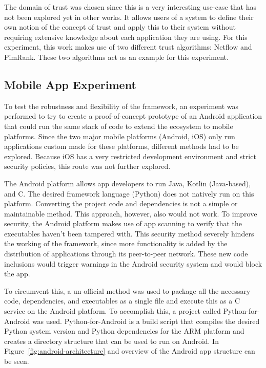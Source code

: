 The domain of trust was chosen since this is a very interesting use-case that has not been explored yet in other works. It allows users of a system to define their own notion of the concept of trust and apply this to their system without requiring extensive knowledge about each application they are using. For this experiment, this work makes use of two different trust algorithms: Netflow and PimRank. These two algorithms act as an example for this experiment.


\subsection{Mobile App Experiment}

To test the robustness and flexibility of the framework, an experiment was performed to try to create a proof-of-concept prototype of an Android application that could run the same stack of code to extend the ecosystem to mobile platforms. Since the two major mobile platforms (Android, iOS) only run applications custom made for these platforms, different methods had to be explored. Because iOS has a very restricted development environment and strict security policies, this route was not further explored.

The Android platform allows app developers to run Java, Kotlin (Java-based), and C. The desired framework language (Python) does not natively run on this platform. Converting the project code and dependencies is not a simple or maintainable method. This approach, however, also would not work. To improve security, the Android platform makes use of app scanning to verify that the executables haven't been tampered with. This security method severely hinders the working of the framework, since more functionality is added by the distribution of applications through its peer-to-peer network. These new code inclusions would trigger warnings in the Android security system and would block the app.

To circumvent this, a un-official method was used to package all the necessary code, dependencies, and executables as a single file and execute this as a C service on the Android platform. To accomplish this, a project called Python-for-Android was used. Python-for-Android is a build script that compiles the desired Python system version and Python dependencies for the ARM platform and creates a directory structure that can be used to run on Android. In Figure~\ref{fig:android-architecture} and overview of the Android app structure can be seen.

